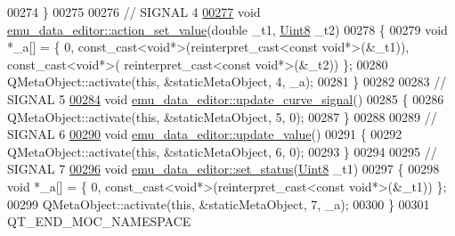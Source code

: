 \begin{DoxyCode}
00274 \}
00275 
00276 \textcolor{comment}{// SIGNAL 4}
\hypertarget{a00014_source_l00277}{}\hyperlink{a00004_a7c1fa0d7d1623b11d4badceb1854010e}{00277} \textcolor{keywordtype}{void} \hyperlink{a00004_a7c1fa0d7d1623b11d4badceb1854010e}{emu\_data\_editor::action\_set\_value}(\textcolor{keywordtype}{double} \_t1, 
      \hyperlink{a00001_a979e3e23b9a449e69ab6a8a83b6042f8}{Uint8} \_t2)
00278 \{
00279     \textcolor{keywordtype}{void} *\_a[] = \{ 0, \textcolor{keyword}{const\_cast<}\textcolor{keywordtype}{void}*\textcolor{keyword}{>}(\textcolor{keyword}{reinterpret\_cast<}\textcolor{keyword}{const }\textcolor{keywordtype}{void}*\textcolor{keyword}{>}(&\_t1)), \textcolor{keyword}{const\_cast<}\textcolor{keywordtype}{void}*\textcolor{keyword}{>}(\textcolor{keyword}{
      reinterpret\_cast<}\textcolor{keyword}{const }\textcolor{keywordtype}{void}*\textcolor{keyword}{>}(&\_t2)) \};
00280     QMetaObject::activate(\textcolor{keyword}{this}, &staticMetaObject, 4, \_a);
00281 \}
00282 
00283 \textcolor{comment}{// SIGNAL 5}
\hypertarget{a00014_source_l00284}{}\hyperlink{a00004_a7dfbddd62d6782b0f0ce809cbf2338ba}{00284} \textcolor{keywordtype}{void} \hyperlink{a00004_a7dfbddd62d6782b0f0ce809cbf2338ba}{emu\_data\_editor::update\_curve\_signal}()
00285 \{
00286     QMetaObject::activate(\textcolor{keyword}{this}, &staticMetaObject, 5, 0);
00287 \}
00288 
00289 \textcolor{comment}{// SIGNAL 6}
\hypertarget{a00014_source_l00290}{}\hyperlink{a00004_ad5f20fdbb4731185020ff4e90cd1ead2}{00290} \textcolor{keywordtype}{void} \hyperlink{a00004_ad5f20fdbb4731185020ff4e90cd1ead2}{emu\_data\_editor::update\_value}()
00291 \{
00292     QMetaObject::activate(\textcolor{keyword}{this}, &staticMetaObject, 6, 0);
00293 \}
00294 
00295 \textcolor{comment}{// SIGNAL 7}
\hypertarget{a00014_source_l00296}{}\hyperlink{a00004_a9476424a86a6ed4f84c64d0ac77143cc}{00296} \textcolor{keywordtype}{void} \hyperlink{a00004_a9476424a86a6ed4f84c64d0ac77143cc}{emu\_data\_editor::set\_status}(\hyperlink{a00001_a979e3e23b9a449e69ab6a8a83b6042f8}{Uint8} \_t1)
00297 \{
00298     \textcolor{keywordtype}{void} *\_a[] = \{ 0, \textcolor{keyword}{const\_cast<}\textcolor{keywordtype}{void}*\textcolor{keyword}{>}(\textcolor{keyword}{reinterpret\_cast<}\textcolor{keyword}{const }\textcolor{keywordtype}{void}*\textcolor{keyword}{>}(&\_t1)) \};
00299     QMetaObject::activate(\textcolor{keyword}{this}, &staticMetaObject, 7, \_a);
00300 \}
00301 QT\_END\_MOC\_NAMESPACE
\end{DoxyCode}
